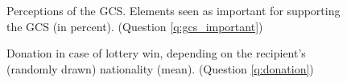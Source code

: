 \begin{figure}[h!]
    \caption[Perceptions of the GCS]{Perceptions of the GCS. Elements seen as important for supporting the GCS (in percent). (Question \ref{q:gcs_important})}\label{fig:gcs_important}
\end{figure}

\begin{figure}[h!]
    \caption[Donation to Africa vs. own country]{Donation in case of lottery win, depending on the recipient's (randomly drawn) nationality (mean). (Question \ref{q:donation})}\label{fig:donation}
\end{figure}

